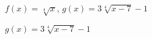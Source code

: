 {$f(x) = \sqrt[4]{x}$, $g(x) = 3\sqrt[4]{x - 7} - 1$}
{$g(x) = 3\sqrt[4]{x - 7} - 1$\\
\begin{center}
\end{center}}



